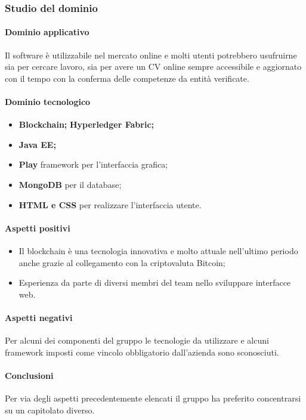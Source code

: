 	\subsubsection{Studio del dominio}
	\paragraph{Dominio applicativo} \Spazio
	Il software è utilizzabile nel mercato online e molti utenti potrebbero usufruirne sia per cercare lavoro, sia per avere un CV online sempre accessibile e aggiornato con il tempo con la conferma delle competenze da entità verificate.
	\paragraph{Dominio tecnologico} \Spazio
	\begin{itemize}
		\item \textbf{Blockchain;}
		\textbf{Hyperledger Fabric;}
		\item  \textbf{Java EE;}
		\item  \textbf{Play} framework per l'interfaccia grafica;
		\item  \textbf{MongoDB} per il database;
		\item  \textbf{HTML e CSS} per realizzare l'interfaccia utente.
	\end{itemize}
	
	\paragraph{Aspetti positivi} \Spazio
	\begin{itemize}
		\item {Il blockchain è una tecnologia innovativa e molto attuale nell'ultimo periodo anche grazie al collegamento con la criptovaluta Bitcoin;}
		\item {Esperienza da parte di diversi membri del team nello sviluppare interfacce web.}
	\end{itemize} 
	\paragraph{Aspetti negativi} \Spazio
	Per alcuni dei componenti del gruppo le tecnologie da utilizzare e alcuni framework imposti come vincolo obbligatorio dall'azienda sono sconosciuti.
	\paragraph{Conclusioni} \Spazio
	Per via degli aspetti precedentemente elencati il gruppo ha preferito concentrarsi su un capitolato diverso.
	
